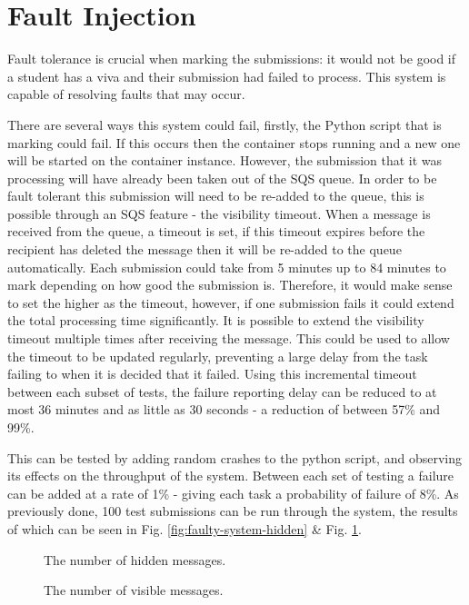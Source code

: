 \documentclass[runningheads]{llncs}
\begin{document}
\section{Fault Injection}
Fault tolerance is crucial when marking the submissions: it would not be good if a student has a viva and their submission had failed to process. This system is capable of resolving faults that may occur. 

There are several ways this system could fail, firstly, the Python script that is marking could fail. If this occurs then the container stops running and a new one will be started on the container instance. However, the submission that it was processing will have already been taken out of the SQS queue. In order to be fault tolerant this submission will need to be re-added to the queue, this is possible through an SQS feature - the visibility timeout. When a message is received from the queue, a timeout is set, if this timeout expires before the recipient has deleted the message then it will be re-added to the queue automatically. Each submission could take from 5 minutes up to 84 minutes to mark depending on how good the submission is. Therefore, it would make sense to set the higher as the timeout, however, if one submission fails it could extend the total processing time significantly. It is possible to extend the visibility timeout multiple times after receiving the message. This could be used to allow the timeout to be updated regularly, preventing a large delay from the task failing to when it is decided that it failed. Using this incremental timeout between each subset of tests, the failure reporting delay can be reduced to at most 36 minutes and as little as 30 seconds - a reduction of between 57\% and 99\%.

This can be tested by adding random crashes to the python script, and observing its effects on the throughput of the system. Between each set of testing a failure can be added at a rate of 1\% - giving each task a probability of failure of 8\%. As previously done, 100 test submissions can be run through the system, the results of which can be seen in Fig. \ref{fig:faulty-system-hidden} \& Fig. \ref{fig:faulty-system-visible}. 


\begin{figure}
\vspace{-1em}
\centering
\begin{minipage}{.475\textwidth}
  \centering
  
    \caption{The number of hidden messages.}
    \label{fig:faulty-system-hidden}
\end{minipage}%
\hspace{0.045\textwidth}%
\begin{minipage}{.475\textwidth}
  \centering
  
    \caption{The number of visible messages.}
    \label{fig:faulty-system-visible}
\end{minipage}
\vspace{-1em}
\end{figure}
\end{document}
